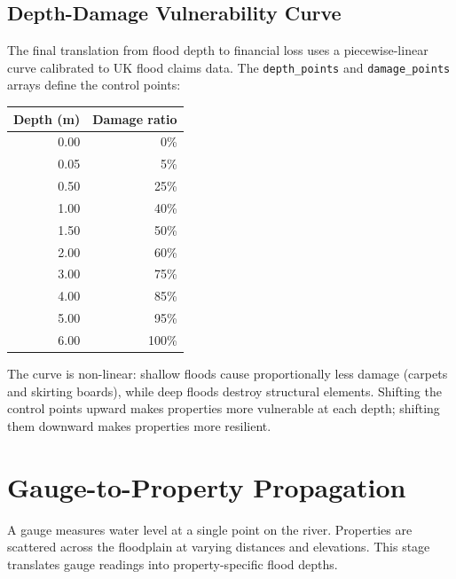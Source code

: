\documentclass[11pt,a4paper]{article}
\begin{document}
\subsection{Depth-Damage Vulnerability Curve}

The final translation from flood depth to financial loss uses a
piecewise-linear curve calibrated to UK flood claims data.  The
\texttt{depth\_points} and \texttt{damage\_points} arrays define the
control points:

\begin{center}
\begin{tabular}{rr}
\toprule
\textbf{Depth (m)} & \textbf{Damage ratio} \\
\midrule
0.00 & 0\% \\
0.05 & 5\% \\
0.50 & 25\% \\
1.00 & 40\% \\
1.50 & 50\% \\
2.00 & 60\% \\
3.00 & 75\% \\
4.00 & 85\% \\
5.00 & 95\% \\
6.00 & 100\% \\
\bottomrule
\end{tabular}
\end{center}

\noindent The curve is non-linear: shallow floods cause proportionally
less damage (carpets and skirting boards), while deep floods destroy
structural elements.  Shifting the control points upward makes
properties more vulnerable at each depth; shifting them downward makes
properties more resilient.


\section{Gauge-to-Property Propagation}
\label{ch:propagation}

A gauge measures water level at a single point on the river.  Properties
are scattered across the floodplain at varying distances and elevations.
This stage translates gauge readings into property-specific flood depths.

\end{document}
